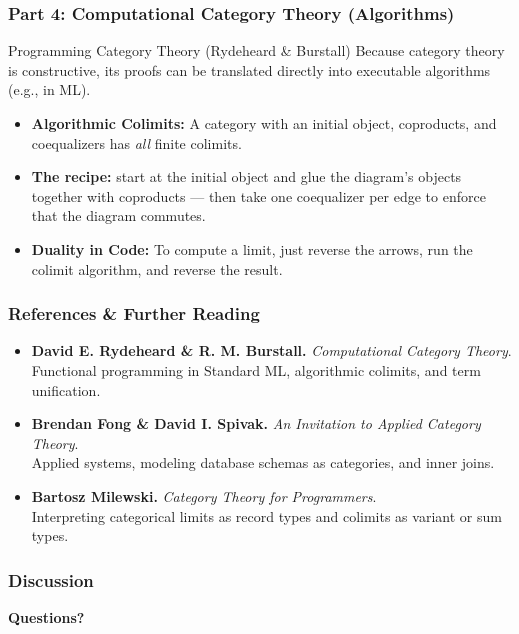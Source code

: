 \documentclass[11pt,t,usepdftitle=false,aspectratio=169]{beamer}
\begin{document}
\begin{frame}
\frametitle{Part 4: Computational Category Theory (Algorithms)}

  \begin{block}{Programming Category Theory (Rydeheard \& Burstall)}
    Because category theory is constructive, its proofs can be translated
    directly into executable algorithms (e.g., in ML).
  \end{block}

  \vspace{0.3cm}
  \begin{itemize}
    \item<2-> \textbf{Algorithmic Colimits:} A category with an initial object,
      coproducts, and coequalizers has \textit{all} finite colimits.
    \item<3-> \textbf{The recipe:} start at the initial object and glue the
      diagram's objects together with coproducts --- then take one
      coequalizer per edge to enforce that the diagram commutes.
    \item<4-> \textbf{Duality in Code:} To compute a limit, just reverse the
      arrows, run the colimit algorithm, and reverse the result.
  \end{itemize}

\end{frame}

\begin{frame}
\frametitle{References \& Further Reading}

  \begin{itemize}
    
    \vspace{0.4cm}
    \item \textbf{David E. Rydeheard \& R. M. Burstall.} \textit{Computational
      Category Theory}. \\
    {\footnotesize \color{gray} Functional programming in Standard ML,
    algorithmic colimits, and term unification.}
    
    \vspace{0.4cm}
    \item \textbf{Brendan Fong \& David I. Spivak.} \textit{An Invitation to
      Applied Category Theory}. \\
    {\footnotesize \color{gray} Applied systems, modeling database schemas as
    categories, and inner joins.}
    
    \vspace{0.4cm}
    \item \textbf{Bartosz Milewski.} \textit{Category Theory for Programmers}.
      \\
    {\footnotesize \color{gray} Interpreting categorical limits as record types
    and colimits as variant or sum types.}
  \end{itemize}

\end{frame}


\begin{frame}
\frametitle{Discussion}
  \centering
  \Large
  \textbf{Questions?}
\end{frame}
\end{document}
